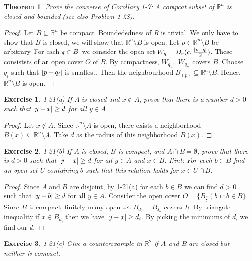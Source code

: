 \documentclass[12pt]{book}
\newtheorem{theorem}{Theorem}
\newtheorem*{exercise*}{Exercise}
\begin{document}
\begin{theorem}
  Prove the converse of Corollary 1-7: A compcat subset of $\mathbb{R}^n$ is closed and bounded (see also Problem 1-28). 
\end{theorem}

\begin{proof}
  Let $B \subseteq \mathbb{R}^n$ be compact. Boundededness of $B$ is trivial. We only have to show that $B$ is closed, we will show that $\mathbb{R}^n \setminus B$ is open. Let $p \in \mathbb{R}^n \setminus B$ be arbitrary. For each $q \in B$, we consider the open set $W_q = B_r(q, \frac{\abs{p-q}}{2})$. These consiststs of an open cover $O$ of $B$. By compactness, $W_{q_1}\ldots W_{q_m}$  covers $B$. Choose $q_i$ such that $\abs{p-q_i}$ is smallest. Then the neighbourhood $B_(p) \subseteq \mathbb{R}^n \setminus B$. Hence, $\mathbb{R}^n\setminus B$ is open. 
\end{proof}

\begin{exercise*}
1-21(a) If $A$ is closed and $x \not\in A$, prove that there is a number $d > 0$ such that $\abs{y-x} \ge d$ for all $y \in A$. 
\end{exercise*}

\begin{proof}
  Let $x \not\in A$. Since $\mathbb{R}^n \setminus A$ is open, there exists a neighborhood $B(x) \subseteq \mathbb{R}^n \setminus A$. Take $d$ as the radius of this neighborhood $B(x)$. 
\end{proof}

\begin{exercise*}
  1-21(b) If $A$ is closed, $B$ is compact, and $A \cap B = \emptyset$, prove that there is $d > 0$ such that $\abs{y-x} \ge d$ for all $y \in A$ and $x \in B$. Hint: For each $b \in B$ find an open set $U$ containing $b$ such that this relation holds for $x \in U \cap B$. 
\end{exercise*}

\begin{proof}
  Since $A$ and $B$ are disjoint, by 1-21(a) for each $b\in B$ we can find $d > 0$ such that $\abs{y -b } \ge d$ for all $y \in A$. Consider the open cover $O = \{B_{\frac{d}{2}}(b) : b \in B\}$. Since $B$ is compact, finitely many open set $B_{d_1}, \ldots B_{d_k}$ covers $B$. By triangale inequality if $x \in B_{d_i}$ then we have $\abs{y -x } \ge d_i$. By picking the minimums of $d_i$ we find our $d$. 
\end{proof}

\begin{exercise*}
  1-21(c) Give a counterexample in $\mathbb{R}^2$ if $A$ and $B$ are closed but neither is compact. 
\end{exercise*}
\end{document}
